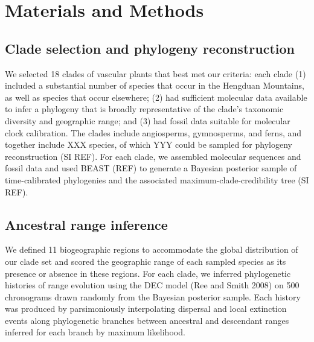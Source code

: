 \section{Materials and Methods}

\subsection{Clade selection and phylogeny reconstruction}

We selected 18 clades of vascular plants that best met our criteria: each clade (1) included a substantial number of species that occur in the Hengduan Mountains, as well as species that occur elsewhere; (2) had sufficient molecular data available to infer a phylogeny that is broadly representative of the clade's taxonomic diversity and geographic range; and (3) had fossil data suitable for molecular clock calibration. The clades include angiosperms, gymnosperms, and ferns, and together include XXX species, of which YYY could be sampled for phylogeny reconstruction (SI REF). For each clade, we assembled molecular sequences and fossil data and used BEAST (REF) to generate a Bayesian posterior sample of time-calibrated phylogenies and the associated maximum-clade-credibility tree (SI REF).

\subsection{Ancestral range inference}

We defined 11 biogeographic regions to accommodate the global distribution of our clade set and scored the geographic range of each sampled species as its presence or absence in these regions. For each clade, we inferred phylogenetic histories of range evolution using the DEC model (Ree and Smith 2008) on 500 chronograms drawn randomly from the Bayesian posterior sample. Each history was produced by parsimoniously interpolating dispersal and local extinction events along phylogenetic branches between ancestral and descendant ranges inferred for each branch by maximum likelihood.
